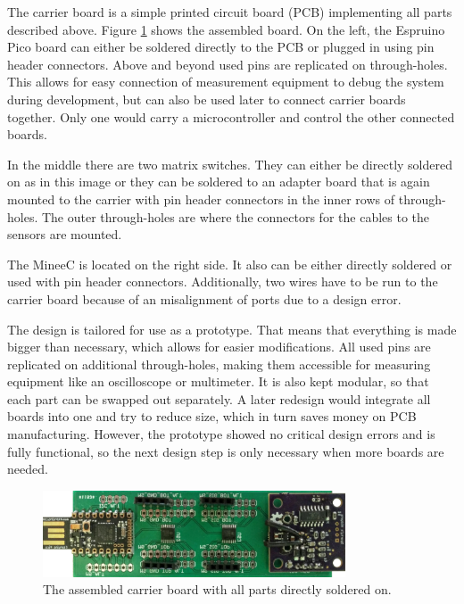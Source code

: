 The carrier board is a simple printed circuit board (PCB) implementing all parts described above. Figure \ref{fig:cb} shows the assembled board. On the left, the Espruino Pico board can either be soldered directly to the PCB or plugged in using pin header connectors. Above and beyond used pins are replicated on through-holes. This allows for easy connection of measurement equipment to debug the system during development, but can also be used later to connect carrier boards together. Only one would carry a microcontroller and control the other connected boards.

In the middle there are two matrix switches. They can either be directly soldered on as in this image or they can be soldered to an adapter board that is again mounted to the carrier with pin header connectors in the inner rows of through-holes.  The outer through-holes are where the connectors for the cables to the sensors are mounted.

The MineeC is located on the right side. It also can be either directly soldered or used with pin header connectors. Additionally, two wires have to be run to the carrier board because of an misalignment of ports due to a design error.

The design is tailored for use as a prototype. That means that everything is made bigger than necessary, which allows for easier modifications. All used pins are replicated on additional through-holes, making them accessible for measuring equipment like an oscilloscope or multimeter. It is also kept modular, so that each part can be swapped out separately. A later redesign would integrate all boards into one and try to reduce size, which in turn saves money on PCB manufacturing. However, the prototype showed no critical design errors and is fully functional, so the next design step is only necessary when more boards are needed.

\begin{figure}
	\begin{center}
		\includegraphics[width=0.8\textwidth]{images/cb.jpg} 
		\caption{The assembled carrier board with all parts directly soldered on.}
		\label{fig:cb}
	\end{center}
\end{figure}

